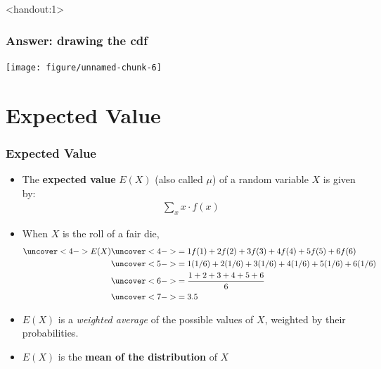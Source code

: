 \documentclass[handout]{beamer}\usepackage{graphicx, color}
\newenvironment{knitrout}{}{} %
\newcommand{\answers}{1}
\numberwithin{equation}{section}
\begin{document}
\begin{frame}<handout:\answers>
\frametitle{Answer: drawing the cdf}

\begin{knitrout}
\color{fgcolor}
\texttt{[image: figure/unnamed-chunk-6]} 

\end{knitrout}

\end{frame}

\section{Expected Value}


\begin{frame}
\frametitle{Expected Value} \small
\begin{itemize}
\pause \item The {\bf expected value} $E(X)$ (also called $\mu$) of a random variable $X$ is given by:
\begin{align*}
\sum_{x} x \cdot f(x)
\end{align*}
\pause \item When $X$ is the roll of a fair die,
\begin{align*}
\uncover<4->{E(X)} & \uncover<4->{= 1 f(1) + 2 f(2) + 3 f(3) + 4 f(4) + 5 f(5) + 6 f(6)} \\
& \uncover<5->{= 1 (1/6) + 2 (1/6) + 3 (1/6) + 4 (1/6) + 5 (1/6) + 6 (1/6)} \\ 
& \uncover<6->{= \frac{1+2+3+4+5+6}{6}} \\
& \uncover<7->{= 3.5}
\end{align*}
\pause \pause \pause \pause \pause \item $E(X)$ is a \emph{weighted average} of the possible values of $X$, weighted by their probabilities.
\pause \item $E(X)$ is the {\bf mean of the distribution} of $X$
\end{itemize}
\end{frame}
\end{document}
